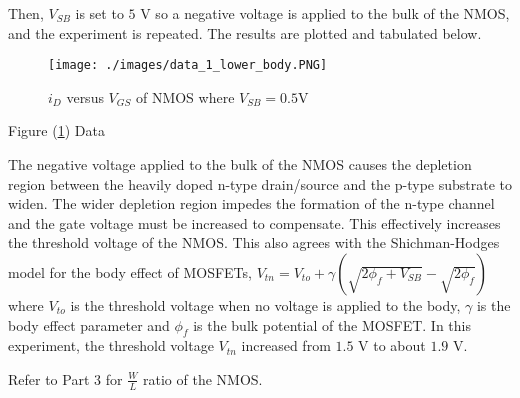 Then, $V_{SB}$ is set to $5$ \si{\volt} so a negative voltage is applied to the bulk of the NMOS, and the experiment is repeated.
The results are plotted and tabulated below. \\

\FloatBarrier

\begin{figure}[h!]
	\centering
	\texttt{[image: ./images/data\_1\_lower\_body.PNG]}
	\caption{$i_{D}$ versus $V_{GS}$ of NMOS where $V_{SB}= 0.5$\si{\volt}}
	\label{fig:data_1_b}
\end{figure}

\FloatBarrier

\begin{table}[h!]
	\centering
	\caption{Figure (\ref{fig:data_1_b}) Data}
	\label{tab:data_1_b}
\end{table}

\FloatBarrier

The negative voltage applied to the bulk of the NMOS causes the depletion region between the heavily doped n-type drain/source and the p-type substrate to widen. 
The wider depletion region impedes the formation of the n-type channel and the gate voltage must be increased to compensate.
This effectively increases the threshold voltage of the NMOS.
This also agrees with the Shichman-Hodges model for the body effect of MOSFETs, $V_{tn} = V_{to} + \gamma(\sqrt{2\phi_f + V_{SB}} - \sqrt{2\phi_f})$ where $V_{to}$ is the threshold voltage when no voltage is applied to the body, $\gamma$ is the body effect parameter and $\phi_f$ is the bulk potential of the MOSFET.
In this experiment, the threshold voltage $V_{tn}$ increased from $1.5$ \si{\volt} to about $1.9$ \si{\volt}.

Refer to Part 3 for $\frac{W}{L}$ ratio of the NMOS.
